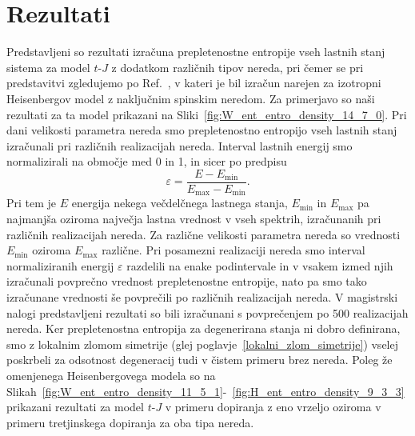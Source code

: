 \section{Rezultati}
Predstavljeni so rezultati izračuna prepletenostne entropije vseh lastnih stanj sistema za model $t$-$J$ z dodatkom različnih tipov nereda, pri čemer se pri predstavitvi zgledujemo po Ref.~\cite{luitz2015many}, v kateri je bil izračun narejen za izotropni Heisenbergov model z naključnim spinskim neredom. Za primerjavo so naši rezultati za ta model prikazani na Sliki~\ref{fig:W_ent_entro_density_14_7_0}. Pri dani velikosti parametra nereda smo prepletenostno entropijo vseh lastnih stanj izračunali pri različnih realizacijah nereda. Interval lastnih energij smo normalizirali na območje med 0 in 1, in sicer po predpisu 
\begin{equation}
\varepsilon=\frac{E-E_\mathrm{min}}{E_\mathrm{max}-E_\mathrm{min}}.
\end{equation}
Pri tem je $E$ energija nekega večdelčnega lastnega stanja, $E_\mathrm{min}$ in $E_\mathrm{max}$ pa najmanjša oziroma največja lastna vrednost v vseh spektrih, izračunanih pri različnih realizacijah nereda. Za različne velikosti parametra nereda so vrednosti $E_\mathrm{min}$ oziroma $E_\mathrm{max}$ različne. Pri posamezni realizaciji nereda smo interval normaliziranih energij $\varepsilon$ razdelili na enake podintervale in v vsakem izmed njih izračunali povprečno vrednost prepletenostne entropije, nato pa smo tako izračunane vrednosti še povprečili po različnih realizacijah nereda. V magistrski nalogi predstavljeni rezultati so bili izračunani s povprečenjem po 500 realizacijah nereda. Ker prepletenostna entropija za degenerirana stanja ni dobro definirana, smo z lokalnim zlomom simetrije (glej poglavje~\ref{lokalni_zlom_simetrije}) vselej poskrbeli za odsotnost degeneracij tudi v čistem primeru brez nereda.
Poleg že omenjenega Heisenbergovega modela so na Slikah~\ref{fig:W_ent_entro_density_11_5_1}-~\ref{fig:H_ent_entro_density_9_3_3} prikazani rezultati za model $t$-$J$ v primeru dopiranja z eno vrzeljo oziroma v primeru tretjinskega dopiranja za oba tipa nereda.
